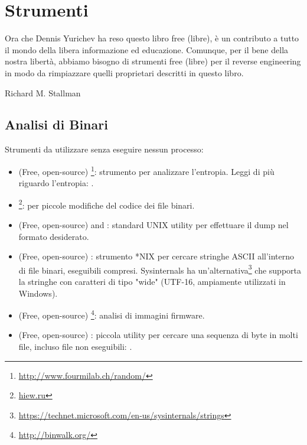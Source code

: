 \chapter{Strumenti}

\epigraph{Ora che Dennis Yurichev ha reso questo libro free (libre), è un
contributo a tutto il mondo della libera informazione ed educazione.
Comunque, per il bene della nostra libertà, abbiamo bisogno di strumenti free (libre) per il reverse
engineering in modo da rimpiazzare quelli proprietari descritti in questo libro.}{Richard M. Stallman}

\section{Analisi di Binari}

Strumenti da utilizzare senza eseguire nessun processo:


\begin{itemize}
\item
(Free, open-source) \footnote{\url{http://www.fourmilab.ch/random/}}: strumento per analizzare l'entropia.
Leggi di più riguardo l'entropia: .

\item
\label{Hiew}
\footnote{\href{http://go.yurichev.com/17035}{hiew.ru}}:
per piccole modifiche del codice dei file binari.

\item (Free, open-source)  and : standard UNIX utility per effettuare il dump nel formato desiderato. 

\item (Free, open-source) : strumento *NIX per cercare stringhe ASCII all'interno di file binari, eseguibili compresi.
Sysinternals ha un'alternativa\footnote{\url{https://technet.microsoft.com/en-us/sysinternals/strings}}
che supporta la stringhe con caratteri di tipo "wide" (UTF-16, ampiamente utilizzati in Windows).

\item (Free, open-source) \footnote{\url{http://binwalk.org/}}: analisi di immagini firmware.

\item
{}
(Free, open-source) :
piccola utility per cercare una sequenza di byte in molti file,
incluso file non eseguibili: \BGREPURL.
\end{itemize}

